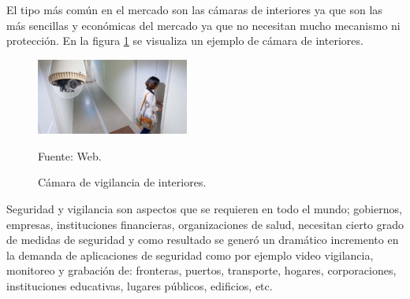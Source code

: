 El tipo más común en el mercado son las cámaras de interiores ya que son las más sencillas y económicas del mercado ya que no necesitan mucho mecanismo ni protección. En la figura \ref{fig:camara} se visualiza un ejemplo de cámara de interiores.\\

\begin{figure}[H]
    \begin{center}
        \includegraphics[width=5cm]{img/capitulo_3/camara_de_interiores.jpg}
    \end{center}
    \begin{center}
        \caption{Cámara de vigilancia de interiores.}
        Fuente: Web.
        \label{fig:camara}
    \end{center}
\end{figure}

Seguridad y vigilancia son aspectos que se requieren en todo el mundo; gobiernos, empresas, instituciones financieras, organizaciones de salud, necesitan cierto grado de medidas de seguridad y como resultado se generó un dramático incremento en la demanda de aplicaciones de seguridad como por ejemplo video vigilancia, monitoreo y grabación de: fronteras, puertos, transporte, hogares, corporaciones, instituciones educativas, lugares públicos, edificios, etc.\\



